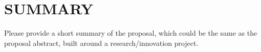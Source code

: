 \documentclass[a4paper,11pt]{article}
\begin{document}


\newpage
\section{SUMMARY}
\label{sec:summary}
Please provide a short summary of the proposal, which could be the same as the proposal abstract, built around a research/innovation project.


% 


\end{document}
